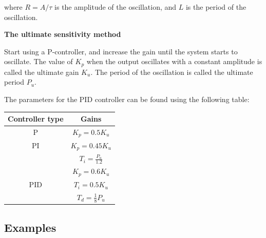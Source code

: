 where $R=A/\tau$ is the amplitude of the oscillation, and $L$ is the period of the oscillation.

\textbf{The ultimate sensitivity method}

Start using a P-controller, and increase the gain until the system starts to oscillate.
The value of $K_p$ when the output oscillates with a constant amplitude is called the ultimate gain $K_u$.
The period of the oscillation is called the ultimate period $P_u$.

The parameters for the PID controller can be found using the following table:
\begin{table}[h]
\centering
\begin{tabular}{|c|c|}
\hline
\cellcolor[HTML]{C0C0C0} \textbf{Controller type}& \cellcolor[HTML]{C0C0C0}\textbf{Gains}  \\ \hline
P&$K_p=0.5K_u$ \\ \hline
PI&$K_p=0.45K_u$\\
  &$T_i=\frac{P_u}{1.2}$\\ \hline
& $K_p=0.6K_u$ \\
 PID &$T_i=0.5K_u$ \\
  &$T_d=\frac{1}{8}P_u$\\ \hline
\end{tabular}
\end{table}


\subsection{Examples}
